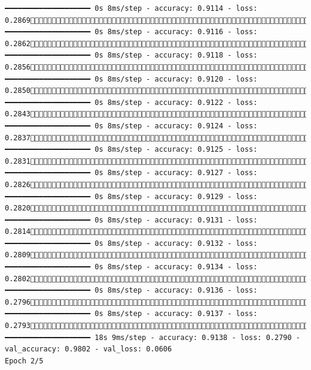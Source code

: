 \documentclass[
  letterpaper,
  DIV=11,
  numbers=noendperiod]{scrreprt}
\begin{document}
\begin{verbatim}
━━━━━━━━━━━━━━━━━━━━ 0s 8ms/step - accuracy: 0.9114 - loss: 0.28691790/1875 ━━━━━━━━━━━━━━━━━━━━ 0s 8ms/step - accuracy: 0.9116 - loss: 0.28621797/1875 ━━━━━━━━━━━━━━━━━━━━ 0s 8ms/step - accuracy: 0.9118 - loss: 0.28561804/1875 ━━━━━━━━━━━━━━━━━━━━ 0s 8ms/step - accuracy: 0.9120 - loss: 0.28501812/1875 ━━━━━━━━━━━━━━━━━━━━ 0s 8ms/step - accuracy: 0.9122 - loss: 0.28431819/1875 ━━━━━━━━━━━━━━━━━━━━ 0s 8ms/step - accuracy: 0.9124 - loss: 0.28371826/1875 ━━━━━━━━━━━━━━━━━━━━ 0s 8ms/step - accuracy: 0.9125 - loss: 0.28311832/1875 ━━━━━━━━━━━━━━━━━━━━ 0s 8ms/step - accuracy: 0.9127 - loss: 0.28261839/1875 ━━━━━━━━━━━━━━━━━━━━ 0s 8ms/step - accuracy: 0.9129 - loss: 0.28201846/1875 ━━━━━━━━━━━━━━━━━━━━ 0s 8ms/step - accuracy: 0.9131 - loss: 0.28141853/1875 ━━━━━━━━━━━━━━━━━━━━ 0s 8ms/step - accuracy: 0.9132 - loss: 0.28091861/1875 ━━━━━━━━━━━━━━━━━━━━ 0s 8ms/step - accuracy: 0.9134 - loss: 0.28021868/1875 ━━━━━━━━━━━━━━━━━━━━ 0s 8ms/step - accuracy: 0.9136 - loss: 0.27961872/1875 ━━━━━━━━━━━━━━━━━━━━ 0s 8ms/step - accuracy: 0.9137 - loss: 0.27931875/1875 ━━━━━━━━━━━━━━━━━━━━ 18s 9ms/step - accuracy: 0.9138 - loss: 0.2790 - val_accuracy: 0.9802 - val_loss: 0.0606
Epoch 2/5

\end{verbatim}
\end{document}
